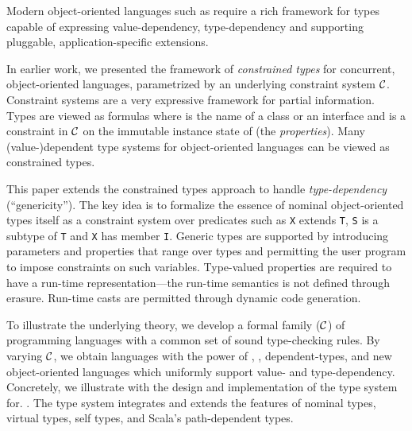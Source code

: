 
Modern object-oriented languages such as \Xten{} require a rich
framework for types capable of expressing value-dependency,
type-dependency and supporting pluggable, application-specific
extensions.

In earlier work, we presented the framework of {\em constrained types}
for concurrent, object-oriented languages, parametrized by an
underlying constraint system $\cal C$. Constraint systems are a very
expressive framework for partial information. Types are viewed as
formulas  where  is the name of a class or an interface
and
 is a constraint in $\cal C$ on the immutable instance state of
 (the {\em properties}). Many (value-)dependent type systems
for object-oriented languages can be viewed as constrained types.

This paper extends the constrained types approach to handle
{\em type-dependency} (``genericity''). The key idea is to formalize the
essence of nominal object-oriented types itself as a constraint system
over predicates such as {\tt X} extends {\tt T}, {\tt S} is a subtype
of {\tt T} and {\tt X} has member {\tt I}. Generic types are supported
by introducing parameters and properties that range over types and
permitting the user program to impose constraints on such
variables. Type-valued properties are required to have a run-time
representation---the run-time semantics is not defined through
erasure. Run-time casts are permitted through dynamic code generation.

To illustrate the underlying theory, we develop a formal family
\FX(${\cal C}$) of programming languages with a common set of sound
type-checking rules.  By varying $\cal C$, we obtain languages with
the power of \FJ, \FGJ, dependent-types, and new object-oriented languages which
uniformly support value- and type-dependency.  Concretely, we
illustrate with the design and implementation of the type system for.
\Xten{}.  The type system integrates and extends the features of
nominal types, virtual types, self types, and Scala's path-dependent
types.
